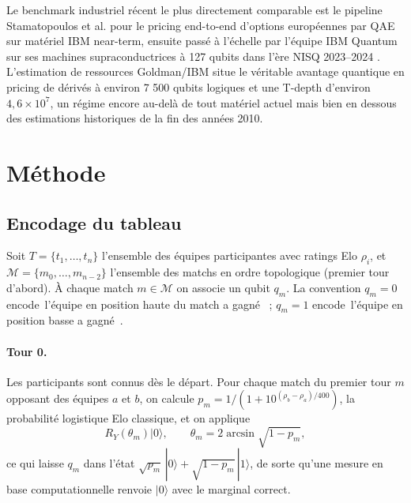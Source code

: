 \documentclass[11pt]{article}
\providecommand{\og}{\guillemotleft\,}
\providecommand{\fg}{\,\guillemotright}
\begin{document}
Le benchmark industriel récent le plus directement comparable est le
pipeline Stamatopoulos et al. \cite{stamatopoulos2020option} pour le
pricing end-to-end d'options européennes par QAE sur matériel IBM
near-term, ensuite passé à l'échelle par l'équipe IBM Quantum sur ses
machines supraconductrices à 127 qubits dans l'ère NISQ 2023--2024
\cite{bharti2022nisq}. L'estimation de ressources Goldman/IBM
\cite{goldman_ibm_2021} situe le véritable avantage quantique en
pricing de dérivés à environ 7 500 qubits logiques et une T-depth
d'environ $4{,}6 \times 10^7$, un régime encore au-delà de tout
matériel actuel mais bien en dessous des estimations historiques de la
fin des années 2010.

\section{Méthode}
\label{sec:method}

\subsection{Encodage du tableau}

Soit $T = \{t_1, \dots, t_n\}$ l'ensemble des équipes participantes
avec ratings Elo $\rho_i$, et $\mathcal{M} = \{m_0, \dots, m_{n-2}\}$
l'ensemble des matchs en ordre topologique (premier tour d'abord). À
chaque match $m \in \mathcal{M}$ on associe un qubit $q_m$. La
convention $q_m = 0$ encode \og l'équipe en position haute du match a
gagné \fg{} ; $q_m = 1$ encode \og l'équipe en position basse a
gagné \fg{}.

\paragraph{Tour 0.} Les participants sont connus dès le départ. Pour
chaque match du premier tour $m$ opposant des équipes $a$ et $b$, on
calcule $p_m = 1/(1 + 10^{(\rho_b - \rho_a)/400})$, la probabilité
logistique Elo classique, et on applique
\[
R_Y\!\left(\theta_m\right) |0\rangle, \qquad
\theta_m = 2 \arcsin\!\sqrt{1 - p_m},
\]
ce qui laisse $q_m$ dans l'état $\sqrt{p_m}\,|0\rangle +
\sqrt{1-p_m}\,|1\rangle$, de sorte qu'une mesure en base
computationnelle renvoie $|0\rangle$ avec le marginal correct.
\end{document}
